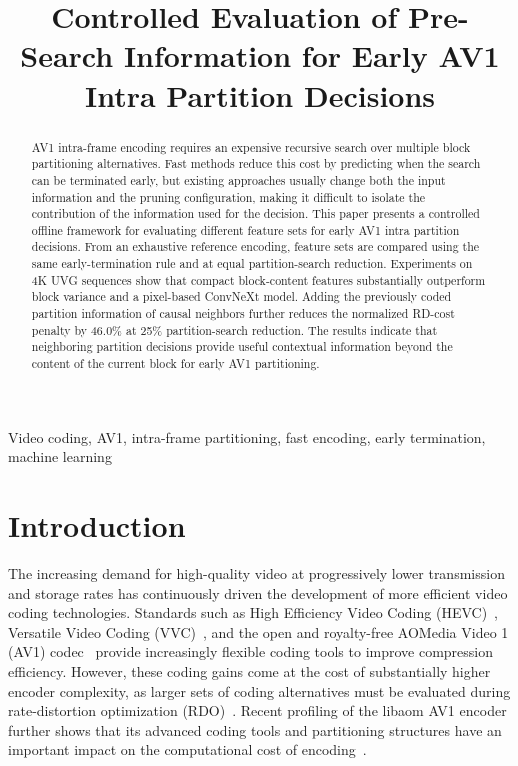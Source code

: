 \documentclass{article}
\title{Controlled Evaluation of Pre-Search Information for Early AV1 Intra Partition Decisions}
\begin{document}
\ninept

\maketitle

\begin{abstract}
AV1 intra-frame encoding requires an expensive recursive search over multiple block partitioning alternatives. Fast methods reduce this cost by predicting when the search can be terminated early, but existing approaches usually change both the input information and the pruning configuration, making it difficult to isolate the contribution of the information used for the decision. This paper presents a controlled offline framework for evaluating different feature sets for early AV1 intra partition decisions. From an exhaustive reference encoding, feature sets are compared using the same early-termination rule and at equal partition-search reduction. Experiments on 4K UVG sequences show that compact block-content features substantially outperform block variance and a pixel-based ConvNeXt model. Adding the previously coded partition information of causal neighbors further reduces the normalized RD-cost penalty by 46.0\% at 25\% partition-search reduction. The results indicate that neighboring partition decisions provide useful contextual information beyond the content of the current block for early AV1 partitioning.
\end{abstract}

\begin{keywords}
Video coding, AV1, intra-frame partitioning, fast encoding, early termination,
machine learning
\end{keywords}

\section{Introduction}
\label{sec:intro}

The increasing demand for high-quality video at progressively lower transmission and storage rates has continuously driven the development of more efficient video coding technologies. Standards such as High Efficiency Video Coding (HEVC)~\cite{itut2013hevc}, Versatile Video Coding (VVC)~\cite{itut2020vvc}, and the open and royalty-free AOMedia Video 1 (AV1) codec~\cite{aomedia2019av1,han2021av1overview} provide increasingly flexible coding tools to improve compression efficiency. However, these coding gains come at the cost of substantially higher encoder complexity, as larger sets of coding alternatives must be evaluated during rate-distortion optimization (RDO)~\cite{sullivan1998rdoptimization,grois2016codingefficiency,layek2017encoderperformance}. Recent profiling of the libaom AV1 encoder further shows that its advanced coding tools and partitioning structures have an important impact on the computational cost of encoding~\cite{bender2023av1complexity}.
\end{document}

